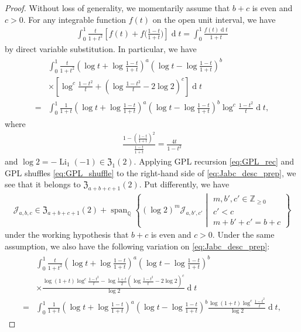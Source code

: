 \documentclass[final,notitlepage,12pt,reqno]{amsart}
\DeclareMathOperator{\Span}{span}
\DeclareMathOperator{\Li}{Li}
\DeclareMathOperator{\D}{d}
\theoremstyle{plain}
\theoremstyle{definition}
\numberwithin{equation}{section}
\begin{document}
\begin{proof}
Without loss of generality, we momentarily assume that $ b+c$ is even and $c>0$. For any   integrable function $ f(t)$ on the open unit interval, we have \begin{align}
\int_0^1\frac{t}{1+t^{2}}\left[f(t)+f\bigg(\frac{1-t}{1+t}\bigg) \right]\D t=\int_{0}^1\frac{f(t)\D t}{1+t}\label{eq:f_01_automorph}
\end{align}by direct variable substitution. In particular, we have\begin{align}
\begin{split}&\int_{0}^{1}\frac{t}{1+t^{2}}\left(\log t+\log\frac{1-t}{1+t}\right)^{a}\left(\log t-\log\frac{1-t}{1+t}\right)^{b}\\{}&\times\left[\log^{c}\frac{1-t^2}{t}+\left( \log\frac{1-t^2}{t} -2\log2\right)^{c}\right]\D t\\={}&\int_{0}^1\frac{1}{1+t}\left(\log t+\log\frac{1-t}{1+t}\right)^{a}\left(\log t-\log\frac{1-t}{1+t}\right)^{b}\log^{c}\frac{1-t^2}{t}\D t,\label{eq:Jabc_desc_prep}
\end{split}
\end{align}where\begin{align}
\frac{1-\left(\frac{1-t}{1+t}\right)^2}{\frac{1-t}{1+t}}=\frac{4t}{1-t^2}
\end{align} and   $ \log2=-\Li_1(-1)\in\mathfrak Z_{1}(2)$.
 Applying GPL recursion \eqref{eq:GPL_rec} and GPL shuffles \eqref{eq:GPL_shuffle}  to the right-hand side of \eqref{eq:Jabc_desc_prep},  we see that it belongs to $ \mathfrak Z_{a+b+c+1}(2)$. Put differently, we have\begin{align}
\mathscr J_{a,b,c}\in \mathfrak Z_{a+b+c+1}(2)+\Span_{\mathbb Q}\left\{(\log2)^m\mathscr J_{a,b',c'}\middle|\begin{smallmatrix}m,b',c'\in\mathbb Z_{\geq0}\\c'< c\\ m+b'+c'=b+c\end{smallmatrix}\right\}\label{eq:Jabc_c_rec}
\end{align} under the working hypothesis that  $ b+c$ is even and $c>0$. Under the same  assumption, we also have the following variation on \eqref{eq:Jabc_desc_prep}:\begin{align}
\begin{split}&\int_{0}^{1}\frac{t}{1+t^{2}}\left(\log t+\log\frac{1-t}{1+t}\right)^{a}\left(\log t-\log\frac{1-t}{1+t}\right)^{b}\\{}&\times\frac{\log (1+t)\log^{c}\frac{1-t^2}{t}-\log \frac{1+t}{2}\left( \log\frac{1-t^2}{t} -2\log2\right)^{c}}{\log2}\D t\\={}&\int_{0}^1\frac{1}{1+t}\left(\log t+\log\frac{1-t}{1+t}\right)^{a}\left(\log t-\log\frac{1-t}{1+t}\right)^{b}\frac{\log (1+t)\log^{c}\frac{1-t^2}{t}}{\log2}\D t,\label{eq:Jabc_desc_prep1}

\end{split}
\end{align}
\end{proof}
\end{document}
